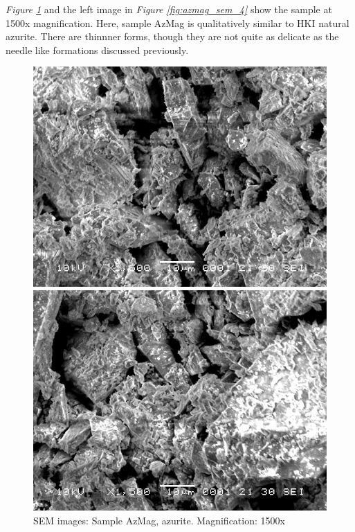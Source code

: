 \textit{Figure \ref{fig:azmag_sem_3}} and the left image in \textit{Figure \ref{fig:azmag_sem_4}} show the sample at 1500x magnification. Here, sample AzMag is qualitatively similar to HKI natural azurite. There are thinnner forms, though they are not quite as delicate as the needle like formations discussed previously. 

\begin{figure}[H]
\centering
\begin{minipage}{.45\textwidth}
  \centering
  \includegraphics[width=\linewidth]{AzMag_x1500_1_160321}
\end{minipage}
\begin{minipage}{.45\textwidth}
  \centering
  \includegraphics[width=\linewidth]{AzMag_x1500_3_160321}
\end{minipage}
\caption[SEM images: Sample AzMag, azurite]{SEM images: Sample AzMag, azurite. Magnification: 1500x}
\label{fig:azmag_sem_3}
\end{figure}

